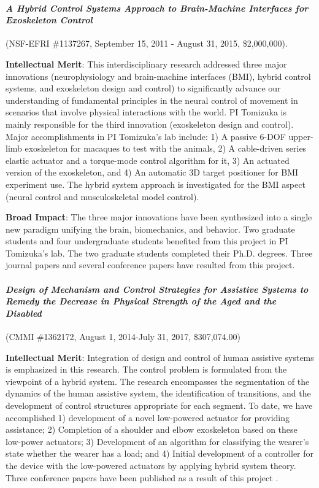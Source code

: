\paragraph*{\textit{A Hybrid Control Systems Approach to Brain-Machine Interfaces for Exoskeleton Control}} (NSF-EFRI \#1137267, September 15, 2011 - August 31, 2015, \$2,000,000). 

\textbf{Intellectual Merit}: This interdisciplinary research addressed three major innovations (neurophysiology and brain-machine interfaces (BMI), hybrid control systems, and exoskeleton design and control) to significantly advance our understanding of fundamental principles in the neural control of movement in scenarios that involve physical interactions with the world. PI Tomizuka is mainly responsible for the third innovation (exoskeleton design and control). Major accomplishments in PI Tomizuka's lab include:
1) A passive 6-DOF upper-limb exoskeleton for macaques to test with the animals, 2) A cable-driven series elastic actuator and a torque-mode control algorithm for it, 3) An actuated version of the exoskeleton, and 4) An automatic 3D target positioner for BMI experiment use. The hybrid system approach is investigated for the BMI aspect (neural control and musculoskeletal model control).
 

\textbf{Broad Impact}: The three major innovations have been synthesized into a single new paradigm unifying the brain, biomechanics, and behavior. Two graduate students and four undergraduate students benefited from this project in PI Tomizuka's lab. The two graduate students completed their Ph.D. degrees.   Three journal papers \cite{lu2016design, lu2016interactive, haninger2016modelling} and several conference papers \cite{lu2013kinematic, haniger2014kinematic, lu2014passive, lu2014design, lu2015design, haninger2016motion, haninger2016robust} have resulted from this project. 

\paragraph*{\textit{Design of Mechanism and Control Strategies for Assistive Systems to Remedy the Decrease in Physical Strength of the Aged and the Disabled}} (CMMI \#1362172, August 1, 2014-July 31, 2017, \$307,074.00)

\textbf{Intellectual Merit}:  Integration of design and control of human assistive systems is emphasized in this research. The control problem is formulated from the viewpoint of a hybrid system. The research encompasses the segmentation of the dynamics of the human assistive system, the identification of transitions, and the development of control structures appropriate for each segment. To date, we have accomplished 1) development of a novel low-powered actuator for providing assistance; 2) Completion of a shoulder and elbow exoskeleton based on these low-power actuators; 3) Development of an algorithm for classifying the wearer's state whether the wearer has a load; and 4) Initial development of a controller for the device with the low-powered actuators by applying hybrid system theory.  Three conference papers have been published as a result of this project \cite{matthew2015introduction, matthew2015initial, matthew2015optimal}.

